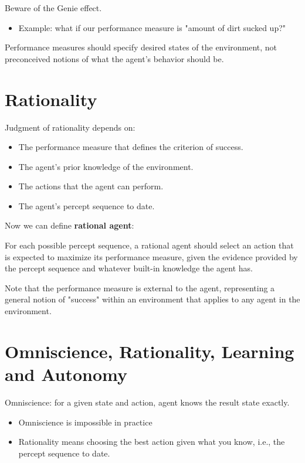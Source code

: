 \documentclass[11pt]{article}
\renewenvironment{quote}{\begin{shaded*}\begin{oldquote}}{\end{oldquote}\end{shaded*}}
\begin{document}
Beware of the Genie effect.

\begin{itemize}
\item Example: what if our performance measure is "amount of dirt sucked up?"
\end{itemize}

\begin{quote}
Performance measures should specify desired states of the environment, not preconceived notions of what the agent's behavior should be.
\end{quote}
\section{Rationality}
\label{sec:orgff0836f}

Judgment of rationality depends on:

\begin{itemize}
\item The performance measure that defines the criterion of success.
\item The agent’s prior knowledge of the environment.
\item The actions that the agent can perform.
\item The agent’s percept sequence to date.
\end{itemize}

Now we can define \textbf{rational agent}:

\begin{quote}
For each possible percept sequence, a rational agent should select an action that is expected to maximize its performance measure, given the evidence provided by the percept sequence and whatever built-in knowledge the agent has.
\end{quote}

Note that the performance measure is external to the agent, representing a general notion of "success" within an environment that applies to any agent in the environment.
\section{Omniscience, Rationality, Learning and Autonomy}
\label{sec:orgc40c2e6}

Omniscience: for a given state and action, agent knows the result state exactly.

\begin{itemize}
\item Omniscience is impossible in practice
\item Rationality means choosing the best action given what you know, i.e., the percept sequence to date.
\end{itemize}
\end{document}
